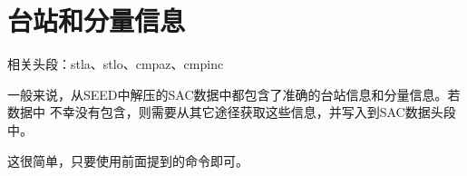 \section{台站和分量信息}
相关头段：stla、stlo、cmpaz、cmpinc

一般来说，从SEED中解压的SAC数据中都包含了准确的台站信息和分量信息。若数据中
不幸没有包含，则需要从其它途径获取这些信息，并写入到SAC数据头段中。

这很简单，只要使用前面提到的命令即可。
